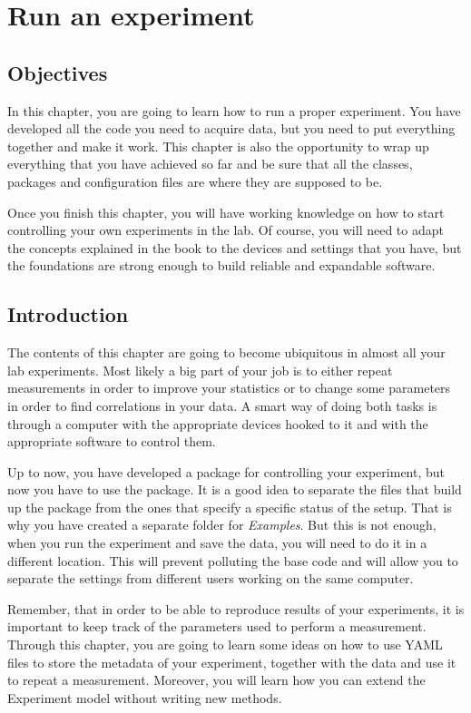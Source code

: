 \chapter{Run an experiment}\label{run-anexperiment}

\section{Objectives}
In this chapter, you are going to learn how to run a proper experiment.
You have developed all the code you need to acquire data, but you need
to put everything together and make it work. This chapter is also the
opportunity to wrap up everything that you have achieved so far and be
sure that all the classes, packages and configuration files are where
they are supposed to be.

Once you finish this chapter, you will have working knowledge on how to
start controlling your own experiments in the lab. Of course, you will
need to adapt the concepts explained in the book to the devices and
settings that you have, but the foundations are strong enough to build
reliable and expandable software.

\section{Introduction}
The contents of this chapter are going to become ubiquitous in almost
all your lab experiments. Most likely a big part of your job is to
either repeat measurements in order to improve your statistics or to
change some parameters in order to find correlations in your data. A
smart way of doing both tasks is through a computer with the appropriate
devices hooked to it and with the appropriate software to control them.

Up to now, you have developed a package for controlling your experiment,
but now you have to use the package. It is a good idea to separate the
files that build up the package from the ones that specify a specific
status of the setup. That is why you have created a separate folder for
\emph{Examples}. But this is not enough, when you run the experiment and
save the data, you will need to do it in a different location. This will
prevent polluting the base code and will allow you to separate the
settings from different users working on the same computer.

Remember, that in order to be able to reproduce results of your
experiments, it is important to keep track of the parameters used to
perform a measurement. Through this chapter, you are going to learn some
ideas on how to use {YAML} files to store the metadata of your
experiment, together with the data and use it to repeat a measurement.
Moreover, you will learn how you can extend the Experiment model without
writing new methods.

